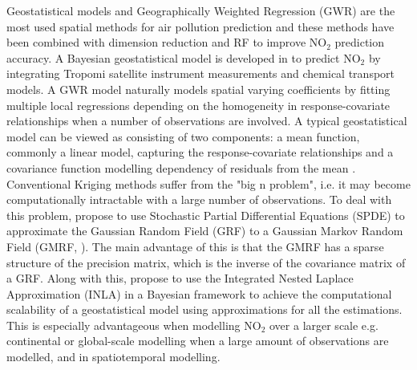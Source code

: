 \documentclass{article}
\begin{document}
Geostatistical models and Geographically Weighted Regression (GWR) are the most used spatial methods for air pollution prediction \citep{vicedo2013bayesian,li2014estimating,wang2021impacts,zou2016high} and these methods have been combined with dimension reduction \cite{zhai2018improved} and RF \citep{zhan2018satellite,liu2020integrate} to improve NO$_2$ prediction accuracy. A Bayesian geostatistical model is developed in \cite{BELOCONI2020105578} to predict NO$_2$ by integrating Tropomi satellite instrument measurements and chemical transport models. A GWR model naturally models spatial varying coefficients by fitting multiple local regressions depending on the homogeneity in response-covariate relationships when a number of observations are involved. A typical geostatistical model can be viewed as consisting of two components: a mean function, commonly a linear model, capturing the response-covariate relationships and a covariance function modelling dependency of residuals from the mean \citep{stackinla}. Conventional Kriging methods suffer from the "big n problem", i.e. it may become computationally intractable with a large number of observations. To deal with this problem, \cite{lindgren2011explicit} propose to use Stochastic Partial Differential Equations (SPDE) to approximate the Gaussian Random Field (GRF) to a Gaussian Markov Random Field (GMRF, \cite{rue2005gaussian}). The main advantage of this is that the GMRF has a sparse structure of the precision matrix, which is the inverse of the covariance matrix of a GRF. Along with this, \cite{rue2009approximate} propose to use the Integrated Nested Laplace Approximation (INLA) in a Bayesian framework to achieve the computational scalability of a geostatistical model using approximations for all the estimations. This is especially advantageous when  modelling NO$_2$ over a larger scale e.g. continental or global-scale modelling when a large amount of observations are modelled, and in spatiotemporal modelling.




\end{document}
